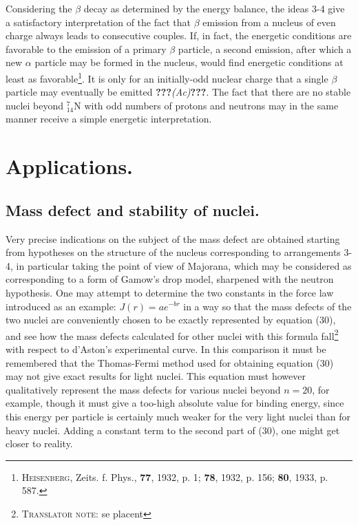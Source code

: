 \documentclass[a4paper,11pt]{article}
\newcommand{\WTF}[1]{\textbf{???}\textit{#1}\textbf{???}}
\newcommand{\?}[2]{#1\footnote{\textsc{Translator note}: #2}}
\renewcommand{\exp}[1]{e^{#1}}
\newcommand{\citeauthor}[1]{\textsc{#1}}
\newcommand{\citepub}[1]{#1}
\newcommand{\citevol}[1]{\textbf{#1}}
\newcommand{\citepage}[1]{#1}
\newcommand{\citeyear}[1]{#1}
\newcommand{\El}[1]{\text{#1}}
\newcommand{\mnEl}[3]{{}^{#1}_{#2}{\El{#3}}}
\begin{document}
{{Considering the $\beta$ decay as determined by the energy balance, the ideas 3-4 give a satisfactory interpretation of the fact that $\beta$ emission from a nucleus of even charge always leads to consecutive couples. If, in fact, the energetic conditions are favorable to the emission of a primary $\beta$ particle, a second emission, after which a new $\alpha$ particle may be formed in the nucleus, would find energetic conditions at least as favorable\footnote{\citeauthor{Heisenberg}, \citepub{Zeits. f. Phys.}, \citevol{77}, \citeyear{1932}, \citepage{p. 1}; \citevol{78}, \citeyear{1932}, \citepage{p. 156}; \citevol{80}, \citeyear{1933}, \citepage{p. 587}.}. It is only for an initially-odd nuclear charge that a single $\beta$ particle may eventually be emitted \WTF{(Ac)}. The fact that there are no stable nuclei beyond $\mnEl{7}{14}{N}$ with odd numbers of protons and neutrons may in the same manner receive a simple energetic interpretation.

\section{Applications.}
\subsection{Mass defect and stability of nuclei.}

Very precise indications on the subject of the mass defect are obtained starting from hypotheses on the structure of the nucleus corresponding to arrangements 3-4, in particular taking the point of view of Majorana, which may be considered as corresponding to a form of Gamow's drop model, sharpened with the neutron hypothesis. One may attempt to determine the two constants in the force law introduced as an example: $J(r) = a\exp{-br}$ in a way so that the mass defects of the two nuclei are conveniently chosen to be exactly represented by equation (30), and see how the mass defects calculated for other nuclei with this formula \?{fall}{se placent} with respect to d'Aston's experimental curve. In this comparison it must be remembered that the Thomas-Fermi method used for obtaining equation (30) may not give exact results for light nuclei. This equation must however qualitatively represent the mass defects for various nuclei beyond $n=20$, for example, though it must give a too-high absolute value for binding energy, since this energy per particle is certainly much weaker for the very light nuclei than for heavy nuclei. Adding a constant term to the second part of (30), one might get closer to reality.

}}
\end{document}
